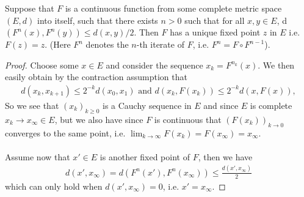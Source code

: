 \documentclass[../mainfile.tex]{subfiles}
\begin{document}
\begin{lem} Suppose that $F$ is a continuous function from some complete metric space $(E,d)$ into itself, such that there exists $n >0$ such that for all $x,y \in E$, d$(F^n(x), F^n(y)) \leq d(x,y)/2$. Then $F$ has a unique fixed point $z$ in $E$ i.e. $F(z)=z$. (Here $F^n$ denotes the $n$-th iterate of $F$, i.e. $F^n = F \circ F^{n-1}$). 
\end{lem}
\newpage
\begin{proof}
Choose some $x \in E$ and consider the sequence $x_k = F^{n_k}(x)$. We then easily obtain by the contraction assumption that 
\begin{align*}
d(x_k, x_{k+1}) \leq 2^{-k} d(x_0,x_1) \text{ and } d(x_k, F(x_k)) \leq 2^{-k} d(x,F(x)),
\end{align*}
So we see that $(x_k)_{k \geq 0}$ is a Cauchy sequence in $E$ and since $E$ is complete $x_k \to x_\infty \in E$, but we also have since $F$ is continuous that $(F(x_k))_{k \to 0 }$ converges to the same point, i.e. $\lim_{k \to \infty} F(x_k)=F(x_\infty)=x_\infty$. 
\\\\
Assume now that $x'\in E$ is another fixed point of $F$, then we have 
\begin{align*}
d(x',x_\infty)= d(F^n(x'),F^n(x_\infty)) \leq \frac{d(x',x_\infty)}{2}
\end{align*}
which can only hold when $d(x',x_\infty)=0$, i.e. $x'=x_\infty$. 
\end{proof}
\end{document}
